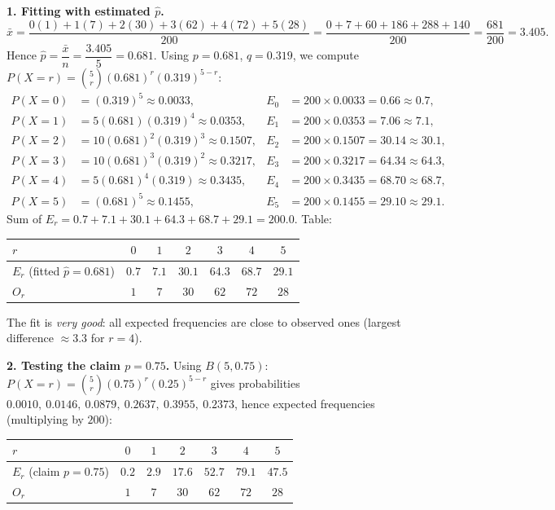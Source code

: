 \documentclass[11pt]{article}
\begin{document}
\begin{corrige}[Exercise 1]
\textbf{1. Fitting with estimated $\hat{p}$.}
\[ \bar{x}=\frac{0(1)+1(7)+2(30)+3(62)+4(72)+5(28)}{200}=\frac{0+7+60+186+288+140}{200}=\frac{681}{200}=3.405. \]
Hence $\hat{p}=\dfrac{\bar{x}}{n}=\dfrac{3.405}{5}=0.681$.
Using $p=0.681$, $q=0.319$, we compute $P(X=r)=\binom{5}{r}(0.681)^r(0.319)^{5-r}$:
\begin{align*}
P(X=0) &= (0.319)^5 \approx 0.0033, & E_0 &= 200\times0.0033 = 0.66 \approx 0.7,\\
P(X=1) &= 5(0.681)(0.319)^4 \approx 0.0353, & E_1 &= 200\times0.0353 = 7.06 \approx 7.1,\\
P(X=2) &= 10(0.681)^2(0.319)^3 \approx 0.1507, & E_2 &= 200\times0.1507 = 30.14 \approx 30.1,\\
P(X=3) &= 10(0.681)^3(0.319)^2 \approx 0.3217, & E_3 &= 200\times0.3217 = 64.34 \approx 64.3,\\
P(X=4) &= 5(0.681)^4(0.319) \approx 0.3435, & E_4 &= 200\times0.3435 = 68.70 \approx 68.7,\\
P(X=5) &= (0.681)^5 \approx 0.1455, & E_5 &= 200\times0.1455 = 29.10 \approx 29.1.
\end{align*}
Sum of $E_r = 0.7+7.1+30.1+64.3+68.7+29.1 = 200.0$. Table:
\begin{center}
\begin{tabular}{|l|c|c|c|c|c|c|}
\hline
\rowcolor{popblueL} $r$ & $0$ & $1$ & $2$ & $3$ & $4$ & $5$ \\
\hline $E_r$ (fitted $\hat{p}=0.681$) & $0.7$ & $7.1$ & $30.1$ & $64.3$ & $68.7$ & $29.1$ \\
\hline $O_r$ & $1$ & $7$ & $30$ & $62$ & $72$ & $28$ \\
\hline
\end{tabular}
\end{center}
The fit is \emph{very good}: all expected frequencies are close to observed ones (largest difference $\approx 3.3$ for $r=4$).

\textbf{2. Testing the claim $p=0.75$.}
Using $B(5,0.75)$: $P(X=r)=\binom{5}{r}(0.75)^r(0.25)^{5-r}$ gives probabilities $0.0010,\ 0.0146,\ 0.0879,\ 0.2637,\ 0.3955,\ 0.2373$, hence expected frequencies (multiplying by $200$):
\begin{center}
\begin{tabular}{|l|c|c|c|c|c|c|}
\hline
\rowcolor{popblueL} $r$ & $0$ & $1$ & $2$ & $3$ & $4$ & $5$ \\
\hline $E_r$ (claim $p=0.75$) & $0.2$ & $2.9$ & $17.6$ & $52.7$ & $79.1$ & $47.5$ \\
\hline $O_r$ & $1$ & $7$ & $30$ & $62$ & $72$ & $28$ \\
\hline
\end{tabular}
\end{center}


\end{corrige}
\end{document}
